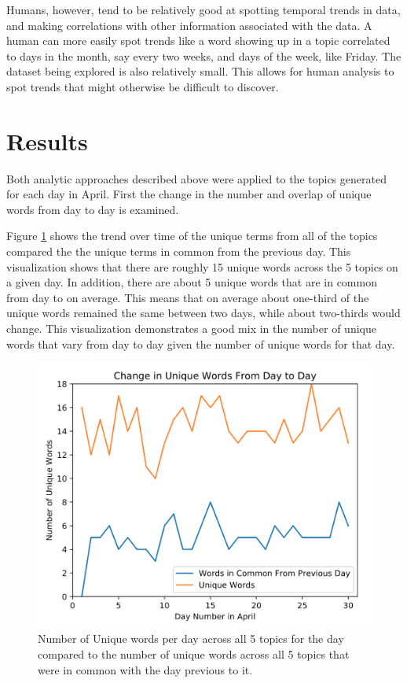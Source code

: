 \documentclass[conference]{IEEEtran}
\begin{document}
Humans, however, tend to be relatively good at spotting temporal trends in data, and making correlations with other information associated with the data. A human can more easily spot trends like a word showing up in a topic correlated to days in the month, say every two weeks, and days of the week, like Friday. The dataset being explored is also relatively small. This allows for human analysis to spot trends that might otherwise be difficult to discover.

\section{Results}
Both analytic approaches described above were applied to the topics generated for each day in April. First the change in the number and overlap of unique words from day to day is examined. 

Figure \ref{fig:UniqueWordsOverTime} shows the trend over time of the unique terms from all of the topics compared the the unique terms in common from the previous day. This visualization shows that there are roughly 15 unique words across the 5 topics on a given day. In addition, there are about 5 unique words that are in common from day to on average. This means that on average about one-third of the unique words remained the same between two days, while about two-thirds would change. This visualization demonstrates a good mix in the number of unique words that vary from day to day given the number of unique words for that day. 

\begin{figure}[!t]
  \centering
  \includegraphics[width=0.9\linewidth]{UniqueWordsOverTime}
  \caption{Number of Unique words per day across all 5 topics for the day compared to the number of unique words across all 5 topics that were in common with the day previous to it.}
  \label{fig:UniqueWordsOverTime}
\end{figure}
\end{document}
